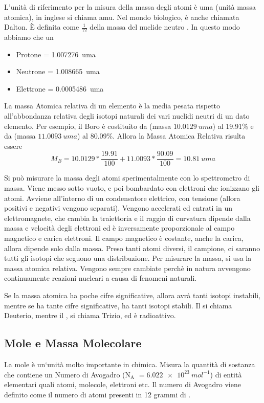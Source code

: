 \documentclass[a4paper]{article}
\begin{document}
L'unità di riferimento per la misura della massa degli atomi è uma (unità massa atomica), in inglese si chiama amu. Nel mondo biologico, è anche chiamata Dalton. È definita come $\frac{1}{12}$ della massa del nuclide neutro . In questo modo abbiamo che un
\begin{itemize}
    \item Protone = \SI{1.007276}{uma}
    \item Neutrone = \SI{1.008665}{uma}
    \item Elettrone = \SI{0.0005486}{uma}
\end{itemize}

La massa Atomica relativa di un elemento è la media pesata rispetto all'abbondanza relativa degli isotopi naturali dei vari nuclidi neutri di un dato elemento. Per esempio, il Boro è costituito da  (massa $\SI{10.0129}{uma}$) al 19.91\% e da  (massa $\SI{11.0093}{uma}$) al 80.09\%. Allora la Massa Atomica Relativa risulta essere
\begin{equation*}
    M_B = 10.0129*\frac{19.91}{100}+11.0093*\frac{90.09}{100} = \SI{10.81}{uma}
\end{equation*}

Si può misurare la massa degli atomi sperimentalmente con lo spettrometro di massa. Viene messo sotto vuoto, e poi bombardato con elettroni che ionizzano gli atomi. Avviene all'interno di un condensatore elettrico, con tensione (allora positivi e negativi vengono separati). Vengono accelerati ed entrati in un elettromagnete, che cambia la traiettoria e il raggio di curvatura dipende dalla massa e velocità degli elettroni ed è inversamente proporzionale al campo magnetico e carica elettroni. Il campo magnetico è costante, anche la carica, allora dipende solo dalla massa. Preso tanti atomi diversi, il campione, ci saranno tutti gli isotopi che seguono una distribuzione. Per misurare la massa, si usa la massa atomica relativa. Vengono sempre cambiate perchè in natura avvengono continuamente reazioni nucleari a causa di fenomeni naturali. 

Se la massa atomica ha poche cifre significative, allora avrà tanti isotopi instabili, mentre se ha tante cifre significative, ha tanti isotopi stabili. Il  si chiama Deuterio, mentre il , si chiama Trizio, ed è radioattivo. 


\subsection{Mole e Massa Molecolare}
La mole è un`unità molto importante in chimica. Misura la quantità di sostanza che contiene un Numero di Avogadro (N$_\text{A}$ $= \SI{6.022e23}{mol^{-1}}$) di entità elementari quali atomi, molecole, elettroni etc. Il numero di Avogadro viene definito come il numero di atomi presenti in 12 grammi di .
\end{document}
